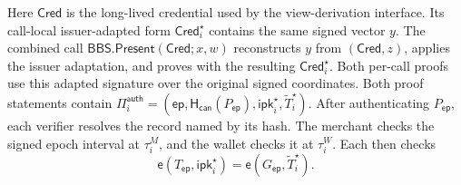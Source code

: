 \documentclass[letterpaper]{article}
\newcommand{\hash}{\mathsf{H}_{\mathsf{can}}}
\newcommand{\pair}{\mathsf{e}}
\begin{document}
Here \(\mathsf{Cred}\) is the long-lived credential used by the view-derivation
interface.  Its call-local issuer-adapted form
\(\mathsf{Cred}_i^\star\) contains the same signed vector \(y\).  The combined call
\(\mathsf{BBS.Present}(\mathsf{Cred};x,w)\) reconstructs \(y\) from
\((\mathsf{Cred},z)\), applies the issuer adaptation, and proves with the
resulting \(\mathsf{Cred}_i^\star\).  Both per-call proofs use this adapted
signature over the original signed coordinates.
Both proof statements contain
\(\Pi_i^{\mathsf{auth}}=(\mathsf{ep},\hash(P_{\mathsf{ep}}),
\mathsf{ipk}_i^\star,\widetilde T_i^\star)\).  After authenticating
\(P_{\mathsf{ep}}\), each verifier resolves the record named by its hash.  The
merchant checks the signed epoch interval at
\(\tau_i^M\), and the wallet checks it at \(\tau_i^W\).  Each then checks
\begin{equation}
  \pair(T_{\mathsf{ep}},\mathsf{ipk}_i^\star)
  =\pair(G_{\mathsf{ep}},\widetilde T_i^\star).
\label{eq:issuer-hidden-relation}
\end{equation}
\end{document}
